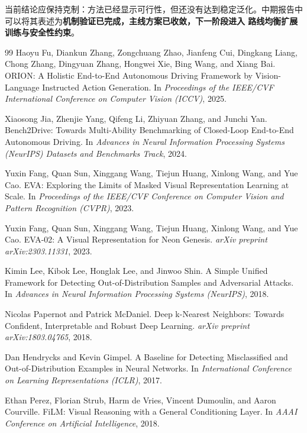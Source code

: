 \documentclass[12pt, a4paper]{ctexart}
\begin{document}
当前结论应保持克制：方法已经显示可行性，但还没有达到稳定泛化。中期报告中可以将其表述为\textbf{机制验证已完成，主线方案已收敛，下一阶段进入 路线均衡扩展训练与安全性约束}。

\begin{thebibliography}{99}
Haoyu Fu, Diankun Zhang, Zongchuang Zhao, Jianfeng Cui, Dingkang Liang, Chong Zhang, Dingyuan Zhang, Hongwei Xie, Bing Wang, and Xiang Bai.
\newblock ORION: A Holistic End-to-End Autonomous Driving Framework by Vision-Language Instructed Action Generation.
\newblock In \emph{Proceedings of the IEEE/CVF International Conference on Computer Vision (ICCV)}, 2025.

Xiaosong Jia, Zhenjie Yang, Qifeng Li, Zhiyuan Zhang, and Junchi Yan.
\newblock Bench2Drive: Towards Multi-Ability Benchmarking of Closed-Loop End-to-End Autonomous Driving.
\newblock In \emph{Advances in Neural Information Processing Systems (NeurIPS) Datasets and Benchmarks Track}, 2024.

Yuxin Fang, Quan Sun, Xinggang Wang, Tiejun Huang, Xinlong Wang, and Yue Cao.
\newblock EVA: Exploring the Limits of Masked Visual Representation Learning at Scale.
\newblock In \emph{Proceedings of the IEEE/CVF Conference on Computer Vision and Pattern Recognition (CVPR)}, 2023.

Yuxin Fang, Quan Sun, Xinggang Wang, Tiejun Huang, Xinlong Wang, and Yue Cao.
\newblock EVA-02: A Visual Representation for Neon Genesis.
\newblock \emph{arXiv preprint arXiv:2303.11331}, 2023.

Kimin Lee, Kibok Lee, Honglak Lee, and Jinwoo Shin.
\newblock A Simple Unified Framework for Detecting Out-of-Distribution Samples and Adversarial Attacks.
\newblock In \emph{Advances in Neural Information Processing Systems (NeurIPS)}, 2018.

Nicolas Papernot and Patrick McDaniel.
\newblock Deep k-Nearest Neighbors: Towards Confident, Interpretable and Robust Deep Learning.
\newblock \emph{arXiv preprint arXiv:1803.04765}, 2018.

Dan Hendrycks and Kevin Gimpel.
\newblock A Baseline for Detecting Misclassified and Out-of-Distribution Examples in Neural Networks.
\newblock In \emph{International Conference on Learning Representations (ICLR)}, 2017.

Ethan Perez, Florian Strub, Harm de Vries, Vincent Dumoulin, and Aaron Courville.
\newblock FiLM: Visual Reasoning with a General Conditioning Layer.
\newblock In \emph{AAAI Conference on Artificial Intelligence}, 2018.


\end{thebibliography}
\end{document}
